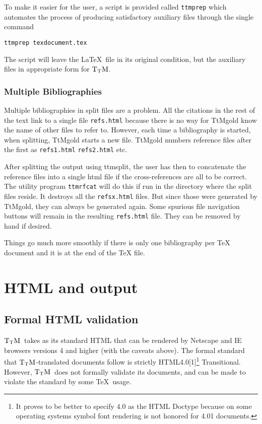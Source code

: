 \documentclass[12pt]{article}
\def\TtM{$\rm{}T_TH$}
\def\TtM{$\rm{}T_TM$}%
\begin{document}
To make it easier for the user, a script is provided called
\verb!ttmprep! which automates the process of producing satisfactory
auxiliary files through the single command

\begin{verbatim}
ttmprep texdocument.tex
\end{verbatim}

\noindent The script will leave the \LaTeX\ file in its original condition,
but the auxiliary files in appropriate form for \TtM.

\subsubsection{Multiple Bibliographies}
Multiple bibliographies in split files are a problem. All the
citations in the rest of the text link to a single file
\verb!refs.html! because there is no way for TtMgold know the name of other
files to refer to. However, each time a bibliography is started,
when splitting, TtMgold starts a new file. TtMgold numbers reference
files after the first as \verb!refs1.html! \verb!refs2.html!
etc. 

After splitting the output using ttmsplit, the user has then to
concatenate the reference files into a single html file if the
cross-references are all to be correct. The utility program
\verb!ttmrfcat! will do this if run in the directory where the split
files reside. It destroys all the \verb!refsx.html! files. But since those
were generated by TtMgold, they can always be generated again. Some
spurious file navigation buttons will remain in the resulting
\verb!refs.html! file. They can be removed by hand if desired.

Things go much more smoothly if there is only one bibliography per TeX
document and it is at the end of the TeX file.



\section{HTML and output}
\subsection{Formal HTML validation}
 \TtM\ takes as its standard HTML that
can be rendered by Netscape and IE browsers versions 4 and higher
(with the caveats above).  The formal standard that \TtM-translated
documents follow is strictly HTML4.0[1]\footnote{It proves to be
  better to specify 4.0 as the HTML Doctype because on some operating
  systems symbol font rendering is not honored for 4.01 documents.}
Transitional. However, \TtM\ does
not formally validate its documents, and can be made to violate the
standard by some \TeX\ usage.
\end{document}
